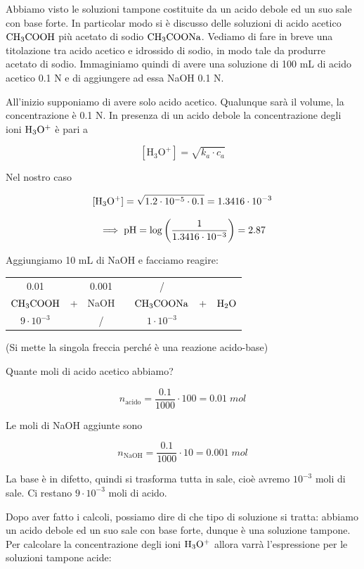 \vspace{0.4cm}Abbiamo visto le soluzioni tampone costituite da un acido debole ed un suo sale con base forte. In particolar modo si è discusso delle soluzioni di acido acetico $\rm CH_3COOH$ più acetato di sodio $\rm CH_3COONa$. Vediamo di fare in breve una titolazione tra acido acetico e idrossido di sodio, in modo tale da produrre acetato di sodio. Immaginiamo quindi di avere una soluzione di 100 mL di acido acetico 0.1 N e di aggiungere ad essa NaOH 0.1 N.

All'inizio supponiamo di avere solo acido acetico. Qualunque sarà il volume, la concentrazione è 0.1 N. In presenza di un acido debole la concentrazione degli ioni $\rm H_3O^+$ è pari a

$$[\text{H}_3\text{O}^+]=\sqrt{k_a \cdot c_a}$$

Nel nostro caso

$$\rm [H_3O^+]=\sqrt{1.2 \cdot 10^{-5} \cdot 0.1}=1.3416 \cdot 10^{-3}$$

$$\implies \rm pH=\log{\left(\frac{1}{1.3416 \cdot 10^{-3}}\right)}=2.87$$

Aggiungiamo 10 mL di NaOH e facciamo reagire:

\begin{center}
    \begin{tabular}{ccccccc}
        0.01 &  & 0.001  & & / & &\\
        $\rm CH_3COOH$ & + & NaOH & \ce{->} & $\rm CH_3COONa$ & + & $\rm H_2O$\\
        $9 \cdot 10^{-3}$ &  &  / & & $1 \cdot 10^{-3}$ & &\\
    \end{tabular}
\end{center}

(Si mette la singola freccia perché è una reazione acido-base)

Quante moli di acido acetico abbiamo?

$$n_{\text{acido}}=\frac{0.1}{1000}\cdot 100 = 0.01 \; mol$$

Le moli di NaOH aggiunte sono

$$n_{\text{NaOH}}=\frac{0.1}{1000}\cdot 10 = 0.001 \; mol$$

La base è in difetto, quindi si trasforma tutta in sale, cioè avremo $10^{-3}$ moli di sale. Ci restano $9 \cdot 10^{-3}$ moli di acido.

Dopo aver fatto i calcoli, possiamo dire di che tipo di soluzione si tratta: abbiamo un acido debole ed un suo sale con base forte, dunque è una soluzione tampone. Per calcolare la concentrazione degli ioni $\rm H_3O^+$ allora varrà l'espressione per le soluzioni tampone acide:

